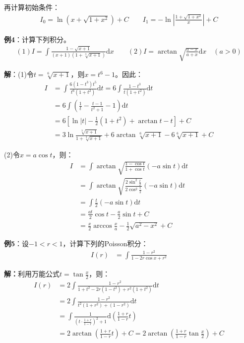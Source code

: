 \documentclass{ctexart}
\let\oldtextbf\textbf %
\renewcommand{\textbf}[1]{\textcolor{btex}{\oldtextbf{#1}}} %
\begin{document}
再计算初始条件：
\begin{align*}
   I_0=\ln(x+\sqrt{1+x^2})+C\qquad I_1=-\ln|\frac{1+\sqrt{1+x^2}}{x}|+C
\end{align*}

\textbf{例4}：计算下列积分。
\begin{align*}
    (1)I=\int\frac{1-\sqrt{x+1}}{(x+1)(1+\sqrt[3]{x+1})}\mathrm{d}x\qquad (2)I=\arctan\sqrt{\frac{a-x}{a+x}}\mathrm{d}x\quad(a>0)
\end{align*}

\textbf{解}：(1)令$t=\sqrt[6]{x+1}$，则$x=t^6-1$。因此：
\begin{align*}
I&=\int \frac{6(1-t^3)t^5}{t^6(1+t^2)}\mathrm{d}t=6\int\frac{1-t^3}{t(1+t^2)}\mathrm{d}t\\
&=6\int\left(\frac{1}{t}-\frac{t-1}{t^2+1}-1 \right)\mathrm{d}t\\
&=6\left[\ln|t|-\frac{1}{2}(1+t^2)+\arctan t-t\right]+C\\
  &=3\ln\frac{\sqrt[3]{x+1}}{1+\sqrt[3]{x+1}}+6\arctan\sqrt[6]{x+1}-6\sqrt[6]{x+1}+C     
\end{align*}

(2)令$x=a\cos t $，则：
\begin{align*}
I&=\int\arctan\sqrt{\frac{1-\cos t}{1+\cos t}}(-a\sin t)\mathrm{d}t\\
&=\int\arctan\sqrt{\frac{2\sin^2\frac{t}{2}}{2\cos^2\frac{t}{2}}}(-a\sin t)\mathrm{d}t\\
&=\int\frac{t}{2}(-a\sin t)\mathrm{d}t\\
&=\frac{at}{2}\cos t-\frac{a}{2}\sin t+C\\
&=\frac{x}{2}\arccos \frac{x}{a}-\frac{1}{2} \sqrt{a^2-x^2}+C          
\end{align*}

\textbf{例5}：设$-1<r<1$，计算下列的Poisson积分：
\begin{align*}
    I(r)&=\int\frac{1-r^2}{1-2r\cos x+r^2}
\end{align*}

\textbf{解：}利用万能公式$t=\tan \frac{x}{2}$，则：
\begin{align*}
I(r)&=2\int\frac{1-r^2}{1+t^2-2r(1-t^2)+r^2(1+t^2)}\mathrm{d}t\\
&=2\int\frac{1-r^2}{t^2(1+r^2)+(1-r^2)}\mathrm{d}t\\
&=\int\frac{1}{(t\cdot\frac{1+r}{1-r})^2+1 }\mathrm{d}(\frac{1+r}{1-r}t)\\
&= 2\arctan (\frac{1+r}{1-r}t)+C =  2\arctan (\frac{1+r}{1-r}\tan\frac{x}{2})+C      
\end{align*}
\end{document}
